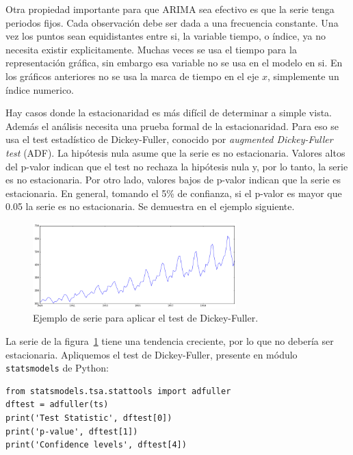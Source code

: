 \documentclass[11pt,spanish,listoffigures,listoftables]{tfgetsinf}
\begin{document}
    Otra propiedad importante para que ARIMA sea efectivo es que la serie tenga periodos fijos. Cada observación debe ser dada a una frecuencia constante. Una vez los puntos sean equidistantes entre si, la variable tiempo, o índice, ya no necesita existir explicitamente. Muchas veces se usa el tiempo para la representación gráfica, sin embargo esa variable no se usa en el modelo en si. En los gráficos anteriores no se usa la marca de tiempo en el eje \(x\), simplemente un índice numerico. 
    
    Hay casos donde la estacionaridad es más difícil de determinar a simple vista. Además el análisis necesita una prueba formal de la estacionaridad. Para eso se usa el test estadístico de Dickey-Fuller, conocido por {\em augmented Dickey-Fuller test} (ADF). La hipótesis nula asume que la serie es no estacionaria. Valores altos del p-valor indican que el test no rechaza la hipótesis nula y, por lo tanto, la serie es no estacionaria. Por otro lado, valores bajos de p-valor indican que la serie es estacionaria. En general, tomando el 5\% de confianza, si el p-valor es mayor que 0.05 la serie es no estacionaria. Se demuestra en el ejemplo siguiente.
    
    
    \begin{figure}[h]
        \centering
        \includegraphics[width=0.7\textwidth]{time_serie_1.png}
        \caption{Ejemplo de serie para aplicar el test de Dickey-Fuller.}
        \label{fig:time_serie_1}
    \end{figure}
    
    La serie de la figura~\ref{fig:time_serie_1} tiene una tendencia creciente, por lo que no debería ser estacionaria. Apliquemos el test de Dickey-Fuller, presente en módulo {\tt statsmodels} de Python:
    
    \lstset{style=python}
    \begin{lstlisting}[caption=Test de Dickey-Fuller de {\tt statsmodels} de Python., label={lst:adf_test_1}]
from statsmodels.tsa.stattools import adfuller
dftest = adfuller(ts)
print('Test Statistic', dftest[0])
print('p-value', dftest[1])
print('Confidence levels', dftest[4])  
    \end{lstlisting}
    
\end{document}
